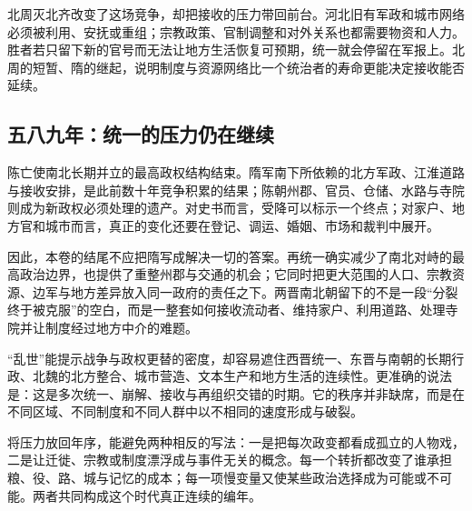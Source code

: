 北周灭北齐改变了这场竞争，却把接收的压力带回前台。河北旧有军政和城市网络必须被利用、安抚或重组；宗教政策、官制调整和对外关系也都需要物资和人力。胜者若只留下新的官号而无法让地方生活恢复可预期，统一就会停留在军报上。北周的短暂、隋的继起，说明制度与资源网络比一个统治者的寿命更能决定接收能否延续。

\subsection{五八九年：统一的压力仍在继续}

陈亡使南北长期并立的最高政权结构结束。隋军南下所依赖的北方军政、江淮道路与接收安排，是此前数十年竞争积累的结果；陈朝州郡、官员、仓储、水路与寺院则成为新政权必须处理的遗产。对史书而言，受降可以标示一个终点；对家户、地方官和城市而言，真正的变化还要在登记、调运、婚姻、市场和裁判中展开。

因此，本卷的结尾不应把隋写成解决一切的答案。再统一确实减少了南北对峙的最高政治边界，也提供了重整州郡与交通的机会；它同时把更大范围的人口、宗教资源、边军与地方差异放入同一政府的责任之下。两晋南北朝留下的不是一段“分裂终于被克服”的空白，而是一整套如何接收流动者、维持家户、利用道路、处理寺院并让制度经过地方中介的难题。

\begin{debate}
“乱世”能提示战争与政权更替的密度，却容易遮住西晋统一、东晋与南朝的长期行政、北魏的北方整合、城市营造、文本生产和地方生活的连续性。更准确的说法是：这是多次统一、崩解、接收与再组织交错的时期。它的秩序并非缺席，而是在不同区域、不同制度和不同人群中以不相同的速度形成与破裂。
\end{debate}

将压力放回年序，能避免两种相反的写法：一是把每次政变都看成孤立的人物戏，二是让迁徙、宗教或制度漂浮成与事件无关的概念。每一个转折都改变了谁承担粮、役、路、城与记忆的成本；每一项慢变量又使某些政治选择成为可能或不可能。两者共同构成这个时代真正连续的编年。
